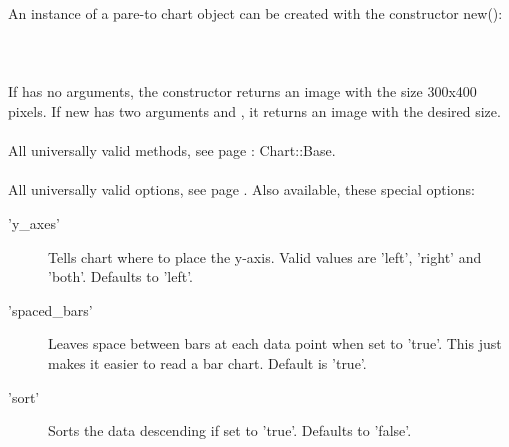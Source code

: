  An instance of a pare-to chart object can be created with the constructor new():\\
\\
\\
\\
If  has no arguments, the constructor returns an image with the size 300x400 pixels. If new has two arguments  and , it returns an image with the desired size. \\ 
\\ 
All universally valid methods, see page \pageref{methods}: Chart::Base. \\
\\
 All universally valid options, see page \pageref{options}. Also available, these special options:
\begin{description}
\item['y\_axes'] Tells chart where to place the y-axis. Valid values are 'left', 'right' and 'both'. Defaults to 'left'.
\item['spaced\_bars']Leaves space between bars at each data point when set to 'true'.  This just makes it easier to read a bar chart.  Default is 'true'.
\item['sort']Sorts the data descending if set to 'true'. Defaults to 'false'.  
\end{description}